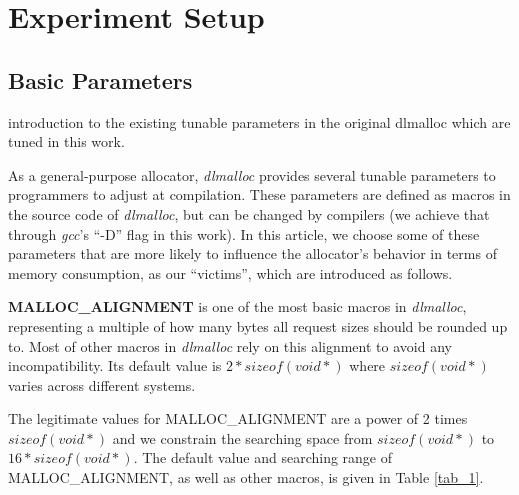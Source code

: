 \documentclass{acm_proc_article-sp}
\begin{document}
\section{Experiment Setup}
\subsection{Basic Parameters}
introduction to the existing tunable parameters in the original dlmalloc which are tuned in this work.

As a general-purpose allocator, \emph{dlmalloc} provides several tunable parameters to programmers to adjust at compilation. These parameters are defined as macros in the source code of \emph{dlmalloc}, but can be changed by compilers (we achieve that through \emph{gcc}'s ``-D'' flag in this work). In this article, we choose some of these parameters that are more likely to influence the allocator's behavior in terms of memory consumption, as our ``victims'', which are introduced as follows.

\textbf{MALLOC\_ALIGNMENT} is one of the most basic macros in \emph{dlmalloc}, representing a multiple of how many bytes all request sizes should be rounded up to. Most of other macros in \emph{dlmalloc} rely on this alignment to avoid any incompatibility. Its default value is $2*sizeof(void*)$ where $sizeof(void*)$ varies across different systems. 
\begin{table}[htbp]
\centering
\caption{\emph{dlmalloc} parameters}
\label{tab_1}
\end{table}
The legitimate values for MALLOC\_ALIGNMENT are a power of 2 times $sizeof(void*)$ and we constrain the searching space from $sizeof(void*)$ to $16*sizeof(void*)$. The default value and searching range of MALLOC\_ALIGNMENT, as well as other macros, is given in Table \ref{tab_1}.
\end{document}
